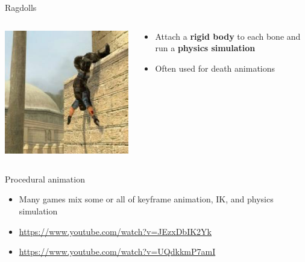 \begin{frame}{Ragdolls}
	\begin{columns}
		\begin{column}{0.4\textwidth}
			\includegraphics[width=\textwidth]{ragdoll}
		\end{column}
		\begin{column}{0.58\textwidth}
			\begin{itemize}
				\pause\item Attach a \textbf{rigid body} to each bone and run a \textbf{physics simulation}
				\pause\item Often used for death animations
			\end{itemize}
		\end{column}
	\end{columns}
\end{frame}

\begin{frame}{Procedural animation}
	\begin{itemize}
		\pause\item Many games mix some or all of keyframe animation, IK, and physics simulation
		\pause\item \url{https://www.youtube.com/watch?v=JEzxDbIK2Yk}
		\pause\item \url{https://www.youtube.com/watch?v=UQdkkmP7amI}
	\end{itemize}
\end{frame}
